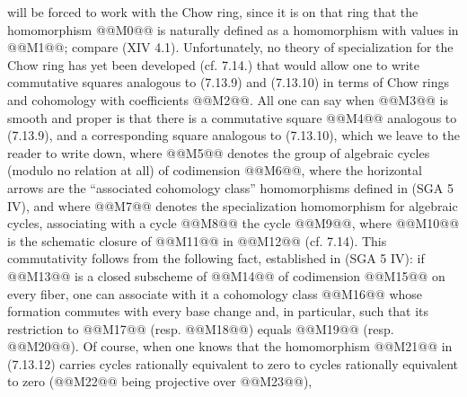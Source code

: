 will be forced to work with the Chow ring, since it is on that ring that the homomorphism @@M0@@ is naturally defined as a homomorphism with values in @@M1@@; compare (XIV 4.1). Unfortunately, no theory of specialization for the Chow ring has yet been developed (cf. 7.14.) that would allow one to write commutative squares analogous to (7.13.9) and (7.13.10) in terms of Chow rings and cohomology with coefficients @@M2@@. All one can say when @@M3@@ is smooth and proper is that there is a commutative square
@@M4@@
analogous to (7.13.9), and a corresponding square analogous to (7.13.10), which we leave to the reader to write down, where @@M5@@ denotes the group of algebraic cycles (modulo no relation at all) of codimension @@M6@@, where the horizontal arrows are the ``associated cohomology class'' homomorphisms defined in (SGA 5 IV), and where @@M7@@ denotes the specialization homomorphism for algebraic cycles, associating with a cycle @@M8@@ the cycle @@M9@@, where @@M10@@ is the schematic closure of @@M11@@ in @@M12@@ (cf. 7.14). This commutativity follows from the following fact, established in (SGA 5 IV): if @@M13@@ is a closed subscheme of @@M14@@ of codimension @@M15@@ on every fiber, one can associate with it a cohomology class @@M16@@ whose formation commutes with every base change and, in particular, such that its restriction to @@M17@@ (resp. @@M18@@) equals @@M19@@ (resp. @@M20@@). Of course, when one knows that the homomorphism @@M21@@ in (7.13.12) carries cycles rationally equivalent to zero to cycles rationally equivalent to zero (@@M22@@ being projective over @@M23@@),
